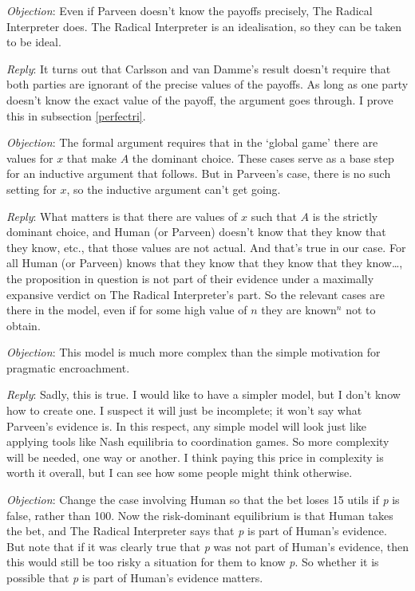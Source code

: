 \documentclass[11pt,]{book}
\begin{document}
\emph{Objection}: Even if Parveen doesn't know the payoffs precisely, The Radical Interpreter does. The Radical Interpreter is an idealisation, so they can be taken
to be ideal.

\emph{Reply}: It turns out that Carlsson and van Damme's result doesn't require that both parties are ignorant of the precise values of the payoffs. As long as one party doesn't know the exact value of the payoff, the argument goes through. I prove this in subsection \ref{perfectri}.

\emph{Objection}: The formal argument requires that in the `global game' there are values for \(x\) that make \(A\) the dominant choice. These cases serve as a base step for an inductive argument that follows. But in Parveen's case, there is no such setting for \(x\), so the inductive argument can't get going.

\emph{Reply}: What matters is that there are values of \(x\) such that \(A\) is the strictly dominant choice, and Human (or Parveen) doesn't know that they know that they know, etc., that those values are not actual. And that's true in our case. For all Human (or Parveen) knows that they know that they know that they know\ldots{}, the proposition in question is not part of their evidence under a maximally expansive verdict on The Radical Interpreter's part. So the relevant cases are there in the model, even if for some high value of \(n\) they are known\(^n\) not to obtain.

\emph{Objection}: This model is much more complex than the simple motivation for pragmatic encroachment.

\emph{Reply}: Sadly, this is true. I would like to have a simpler model, but I don't know how to create one. I suspect it will just be incomplete; it won't say what Parveen's evidence is. In this respect, any simple model will look just like applying tools like Nash equilibria to coordination games. So more complexity will be needed, one way or another. I think paying this price in complexity is worth it overall, but I can see how some people might think otherwise.

\emph{Objection}: Change the case involving Human so that the bet loses 15 utils if \emph{p} is false, rather than 100. Now the risk-dominant equilibrium is that Human takes the bet, and The Radical Interpreter says that \emph{p} is part of Human's evidence. But note that if it was clearly true that \emph{p} was not part of Human's evidence, then this would still be too risky a situation for them to know \emph{p}. So whether it is possible that \emph{p} is part of Human's evidence matters.
\end{document}
